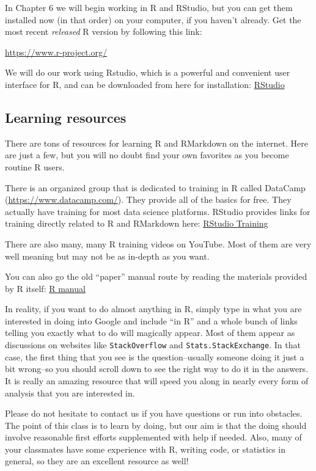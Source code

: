 \documentclass[
]{book}
\begin{document}
In Chapter 6 we will begin working in R and RStudio, but you can get them installed now (in that order) on your computer, if you haven't already. Get the most recent \emph{released} R version by following this link:

\url{https://www.r-project.org/}

We will do our work using Rstudio, which is a powerful and convenient user interface for R, and can be downloaded from here for installation: \href{https://rstudio.com/products/rstudio/}{RStudio}

\hypertarget{learning-resources}{%
\subsection{Learning resources}\label{learning-resources}}

There are tons of resources for learning R and RMarkdown on the internet. Here are just a few, but you will no doubt find your own favorites as you become routine R users.

There is an organized group that is dedicated to training in R called DataCamp (\url{https://www.datacamp.com/}). They provide all of the basics for free. They actually have training for most data science platforms. RStudio provides links for training directly related to R and RMarkdown here: \href{https://education.rstudio.com/}{RStudio Training}

There are also many, many R training videos on YouTube. Most of them are very well meaning but may not be as in-depth as you want.

You can also go the old ``paper'' manual route by reading the materials provided by R itself: \href{https://cran.r-project.org/doc/manuals/r-release/R-intro.pdf}{R manual}

In reality, if you want to do almost anything in R, simply type in what you are interested in doing into Google and include ``in R'' and a whole bunch of links telling you exactly what to do will magically appear. Most of them appear as discussions on websites like \texttt{StackOverflow} and \texttt{Stats.StackExchange}. In that case, the first thing that you see is the question--usually someone doing it just a bit wrong--so you should scroll down to see the right way to do it in the answers. It is really an amazing resource that will speed you along in nearly every form of analysis that you are interested in.

Please do not hesitate to contact us if you have questions or run into obstacles. The point of this class is to learn by doing, but our aim is that the doing should involve reasonable first efforts supplemented with help if needed. Also, many of your classmates have some experience with R, writing code, or statistics in general, so they are an excellent resource as well!
\end{document}
